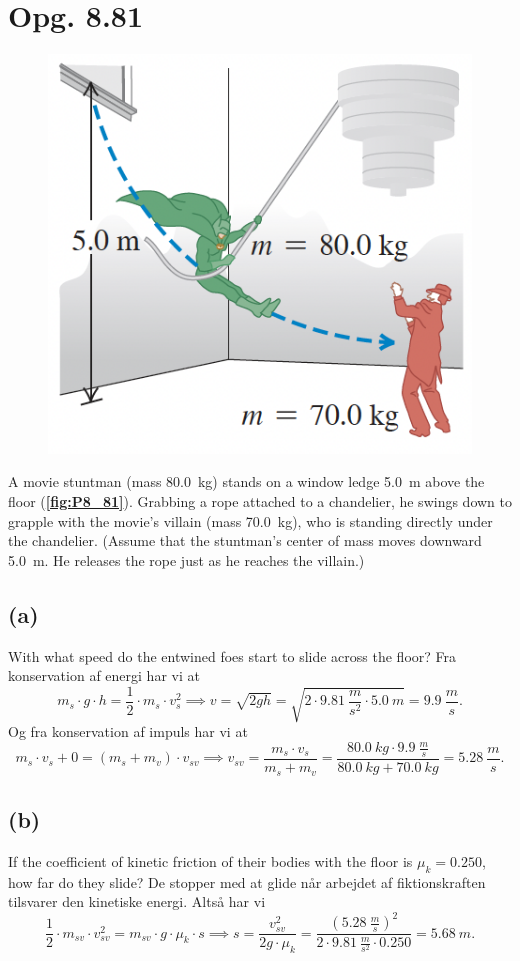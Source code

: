 \documentclass[12pt]{article}
\begin{document}
\section*{Opg. 8.81}

\begin{figure} [ht]
  \centering
  \caption{}
  \includegraphics[width=0.5\linewidth]{../figures/P8_81.png}
  \label{fig:P8_81}
\end{figure}

A movie stuntman (mass \qty{80,0}{kg}) stands on a window ledge \qty{5,0}{m} above the floor (\textbf{\autoref{fig:P8_81}}). Grabbing a rope attached to a chandelier, he swings down to grapple with the movie’s villain (mass \qty{70,0}{kg}), who is standing directly under the chandelier. (Assume that the stuntman’s center of mass moves downward \qty{5,0}{m}. He releases the rope just as he reaches the villain.)

\subsection*{(a)}
With what speed do the entwined foes start to slide across the floor?
\bigbreak
Fra konservation af energi har vi at
\[
m_s\cdot g\cdot h = \frac{1}{2}\cdot m_s \cdot v_s^2 \implies v = \sqrt{2gh} = \sqrt{2\cdot \qty{9,81}{\frac{m}{s^2}}\cdot \qty{5,0}{m}} = \qty{9,9}{\frac{m}{s}}  
.\] 
Og fra konservation af impuls har vi at
\[
m_s\cdot v_s + 0 = (m_s + m_v)\cdot v_{sv} \implies v_{sv} = \frac{m_s\cdot v_s}{m_s+m_v} = \frac{\qty{80,0}{kg}\cdot \qty{9,9}{\frac{m}{s}}}{\qty{80,0}{kg} + \qty{70,0}{kg}} = \qty{5,28}{\frac{m}{s}} 
.\] 

\subsection*{(b)}
If the coefficient of kinetic friction of their bodies with the floor is $\mu_k = \num{0,250}$, how far do they slide?
\bigbreak
De stopper med at glide når arbejdet af fiktionskraften tilsvarer den kinetiske energi. Altså har vi
\[
\frac{1}{2}\cdot m_{sv}\cdot v_{sv}^2 = m_{sv}\cdot g\cdot \mu_k \cdot s \implies s = \frac{v_{sv}^2}{2g\cdot \mu_k} = \frac{\left( \qty{5,28}{\frac{m}{s}} \right)^2 }{2\cdot \qty{9,81}{\frac{m}{s^2}}\cdot \num{0,250}} = \qty{5,68}{m}
.\] 
\end{document}
